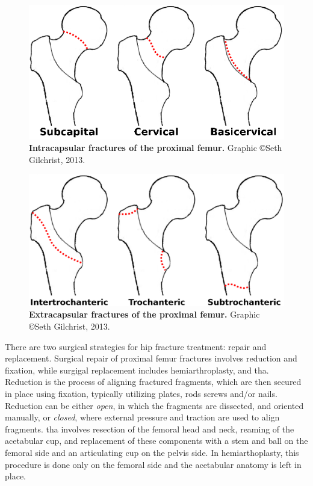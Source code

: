 \begin{figure}
	\centering
	\includegraphics[width=0.7\linewidth]{./intro/Figures/NeckFractues}
	\caption[Intracapsular fractures]{\textbf{Intracapsular fractures of the proximal femur.} Graphic \copyright Seth Gilchrist, 2013.}
	\label{fig:NeckFractues}
\end{figure}

\begin{figure}
	\centering
	\includegraphics[width=0.7\linewidth]{./intro/Figures/ExtracapFractues}
	\caption[Extracapsular fractures]{\textbf{Extracapsular fractures of the proximal femur.} Graphic \copyright Seth Gilchrist, 2013.}
	\label{fig:ExtracapFractues}
\end{figure}

There are two surgical strategies for hip fracture treatment: repair and replacement.
Surgical repair of proximal femur fractures involves reduction and fixation, while surgigal replacement includes hemiarthroplasty, and \ac{tha}.
Reduction is the process of aligning fractured fragments, which are then secured in place using fixation, typically utilizing plates, rods screws and/or nails.
Reduction can be either \textit{open}, in which the fragments are dissected, and oriented manually, or \textit{closed}, where external pressure and traction are used to align fragments.
\ac{tha} involves resection of the femoral head and neck, reaming of the acetabular cup, and replacement of these components with a stem and ball on the femoral side and an articulating cup on the pelvis side.
In hemiarthoplasty, this procedure is done only on the femoral side and the acetabular anatomy is left in place.

